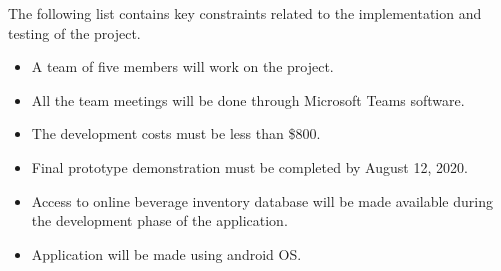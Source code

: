 The following list contains key constraints related to the implementation and testing of the project. 

\begin{itemize}
  \item A team of five members will work on the project.
  \item All the team meetings will be done through Microsoft Teams software.
  \item The development costs must be less than \$800. 
  \item Final prototype demonstration must be completed by August 12, 2020. 
  \item Access to online beverage inventory database will be made available during the development phase of the application.
  \item Application will be made using android OS.

\end{itemize}
